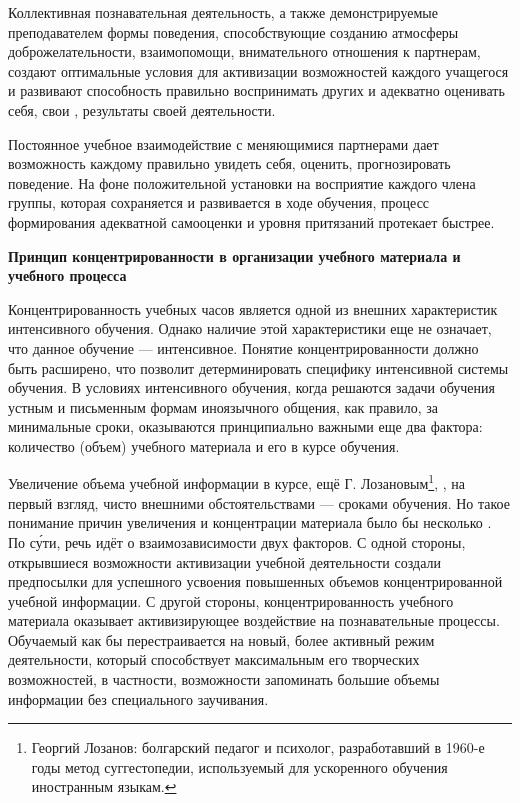Коллективная познавательная деятельность, а также демонстрируемые преподавателем формы поведения, способствующие созданию атмосферы доброжелательности, взаимопомощи, внимательного отношения к партнерам, создают оптимальные условия для активизации возможностей каждого учащегося и развивают способность правильно воспринимать других и адекватно оценивать себя, свои , результаты своей деятельности.

Постоянное учебное взаимодействие с меняющимися партнерами дает возможность каждому правильно увидеть себя, оценить, прогнозировать поведение. На фоне положительной установки на восприятие каждого члена группы, которая сохраняется и развивается в ходе обучения, процесс формирования адекватной самооценки и уровня притязаний протекает быстрее.

\textbf{Принцип концентрированности в организации учебного материала и учебного процесса}

Концентрированность учебных часов является одной из внешних характеристик интенсивного обучения. Однако наличие этой характеристики еще не означает, что данное обучение --- интенсивное. Понятие концентрированности должно быть расширено, что позволит детерминировать специфику интенсивной системы обучения. В условиях интенсивного обучения, когда решаются задачи обучения устным и письменным формам иноязычного общения, как правило, за минимальные сроки, оказываются принципиально важными еще два фактора: количество (объем) учебного материала и его  в курсе обучения.

Увеличение объема учебной информации в курсе,  ещё Г. Лозановым\footnote{Георгий Лозанов: болгарский педагог и психолог, разработавший в 1960-е годы метод суггестопедии, используемый для ускоренного обучения иностранным языкам.}, , на первый взгляд, чисто внешними обстоятельствами ---  сроками обучения. Но такое понимание причин увеличения и концентрации материала было бы несколько . По с\'{у}ти, речь идёт о взаимозависимости двух факторов. С одной стороны, открывшиеся возможности активизации учебной деятельности создали предпосылки для успешного усвоения повышенных объемов концентрированной учебной информации. С другой стороны, концентрированность учебного материала оказывает активизирующее воздействие на познавательные процессы. Обучаемый как бы перестраивается на новый, более активный режим деятельности, который способствует максимальным  его творческих возможностей, в частности, возможности запоминать большие объемы информации без специального заучивания.

